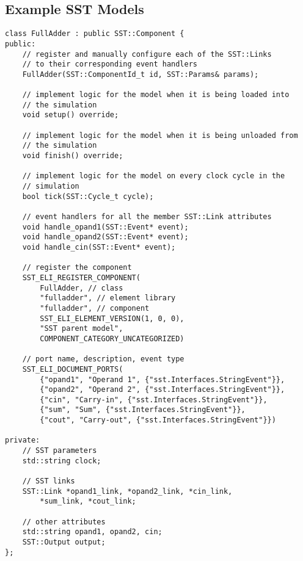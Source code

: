 \begin{appendices}
    \section{Example SST Models}
    \label{appendix:sstCode}

    \newpage
    \begin{lstlisting}[style=customC++,label=currentModel,caption=Example Interface of an SST Component Model]
class FullAdder : public SST::Component {
public:
    // register and manually configure each of the SST::Links
    // to their corresponding event handlers
    FullAdder(SST::ComponentId_t id, SST::Params& params);

    // implement logic for the model when it is being loaded into
    // the simulation
    void setup() override;

    // implement logic for the model when it is being unloaded from
    // the simulation
    void finish() override;

    // implement logic for the model on every clock cycle in the
    // simulation
    bool tick(SST::Cycle_t cycle);

    // event handlers for all the member SST::Link attributes
    void handle_opand1(SST::Event* event);
    void handle_opand2(SST::Event* event);
    void handle_cin(SST::Event* event);

    // register the component
    SST_ELI_REGISTER_COMPONENT(
        FullAdder, // class
        "fulladder", // element library
        "fulladder", // component
        SST_ELI_ELEMENT_VERSION(1, 0, 0),
        "SST parent model",
        COMPONENT_CATEGORY_UNCATEGORIZED)

    // port name, description, event type
    SST_ELI_DOCUMENT_PORTS(
        {"opand1", "Operand 1", {"sst.Interfaces.StringEvent"}},
        {"opand2", "Operand 2", {"sst.Interfaces.StringEvent"}},
        {"cin", "Carry-in", {"sst.Interfaces.StringEvent"}},
        {"sum", "Sum", {"sst.Interfaces.StringEvent"}},
        {"cout", "Carry-out", {"sst.Interfaces.StringEvent"}})

private:
    // SST parameters
    std::string clock;

    // SST links
    SST::Link *opand1_link, *opand2_link, *cin_link, 
        *sum_link, *cout_link;

    // other attributes
    std::string opand1, opand2, cin;
    SST::Output output;
};
\end{lstlisting}

\end{appendices}
